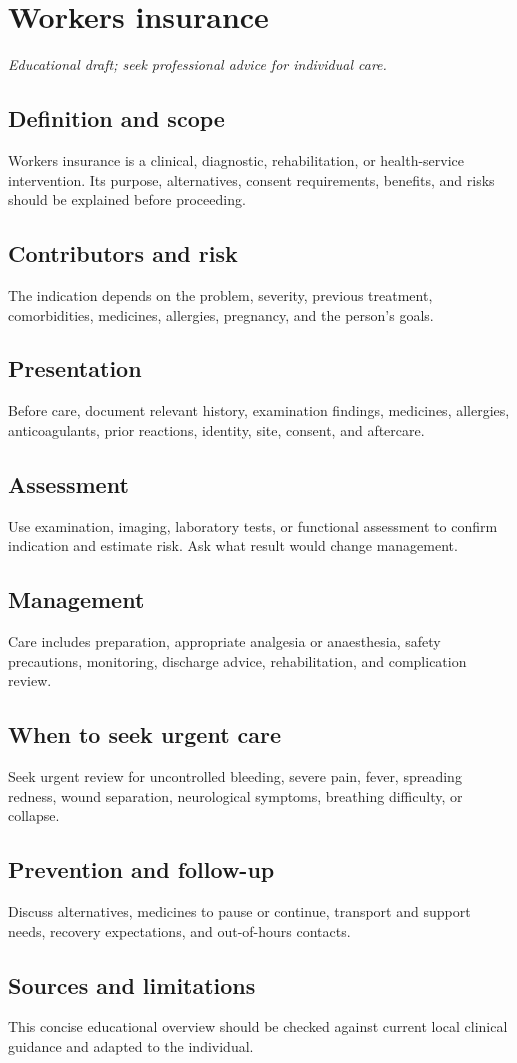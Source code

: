 \chapter{Workers insurance}
\medskip
\noindent\textit{Educational draft; seek professional advice for individual care.}

\section*{Definition and scope}
Workers insurance is a clinical, diagnostic, rehabilitation, or health-service intervention. Its purpose, alternatives, consent requirements, benefits, and risks should be explained before proceeding.

\section*{Contributors and risk}
The indication depends on the problem, severity, previous treatment, comorbidities, medicines, allergies, pregnancy, and the person’s goals.

\section*{Presentation}
Before care, document relevant history, examination findings, medicines, allergies, anticoagulants, prior reactions, identity, site, consent, and aftercare.

\section*{Assessment}
Use examination, imaging, laboratory tests, or functional assessment to confirm indication and estimate risk. Ask what result would change management.

\section*{Management}
Care includes preparation, appropriate analgesia or anaesthesia, safety precautions, monitoring, discharge advice, rehabilitation, and complication review.

\section*{When to seek urgent care}
Seek urgent review for uncontrolled bleeding, severe pain, fever, spreading redness, wound separation, neurological symptoms, breathing difficulty, or collapse.

\section*{Prevention and follow-up}
Discuss alternatives, medicines to pause or continue, transport and support needs, recovery expectations, and out-of-hours contacts.

\section*{Sources and limitations}
This concise educational overview should be checked against current local clinical guidance and adapted to the individual.
